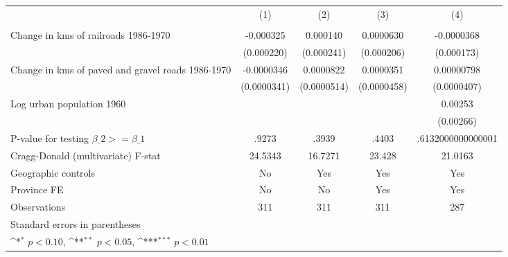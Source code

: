 {
\def\sym#1{\ifmmode^{#1}\else\(^{#1}\)\fi}
\begin{tabular}{l*{4}{c}}
\hline\hline
                &\multicolumn{1}{c}{(1)}&\multicolumn{1}{c}{(2)}&\multicolumn{1}{c}{(3)}&\multicolumn{1}{c}{(4)}\\
                &\multicolumn{1}{c}{}&\multicolumn{1}{c}{}&\multicolumn{1}{c}{}&\multicolumn{1}{c}{}\\
\hline
Change in kms of railroads 1986-1970&-0.000325         & 0.000140         &0.0000630         &-0.0000368         \\
                &(0.000220)         &(0.000241)         &(0.000206)         &(0.000173)         \\
[1em]
Change in kms of paved and gravel roads 1986-1970&-0.0000346         &0.0000822         &0.0000351         &0.00000798         \\
                &(0.0000341)         &(0.0000514)         &(0.0000458)         &(0.0000407)         \\
[1em]
Log urban population 1960&                  &                  &                  &  0.00253         \\
                &                  &                  &                  &(0.00266)         \\
\hline
P-value for testing $\beta\_{2} >= \beta\_{1}$&    .9273         &    .3939         &    .4403         &.6132000000000001         \\
Cragg-Donald (multivariate) F-stat&  24.5343         &  16.7271         &   23.428         &  21.0163         \\
Geographic controls&       No         &      Yes         &      Yes         &      Yes         \\
Province FE     &       No         &       No         &      Yes         &      Yes         \\
Observations    &      311         &      311         &      311         &      287         \\
\hline\hline
\multicolumn{5}{l}{\footnotesize Standard errors in parentheses}\\
\multicolumn{5}{l}{\footnotesize \sym{*} \(p<0.10\), \sym{**} \(p<0.05\), \sym{***} \(p<0.01\)}\\
\end{tabular}
}
